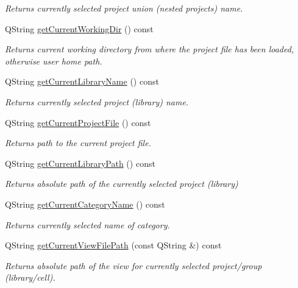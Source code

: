 \begin{DoxyCompactItemize}
\begin{DoxyCompactList}\small\item\em Returns currently selected project union (nested projects) name. \end{DoxyCompactList}\item 
Q\-String \hyperlink{classMainWindow_a122007410ead45d63e205e4aa612ac77}{get\-Current\-Working\-Dir} () const 
\begin{DoxyCompactList}\small\item\em Returns current working directory from where the project file has been loaded, otherwise user home path. \end{DoxyCompactList}\item 
Q\-String \hyperlink{classMainWindow_afae5dfaa6de8707fde2c2cc530a462b4}{get\-Current\-Library\-Name} () const 
\begin{DoxyCompactList}\small\item\em Returns currently selected project (library) name. \end{DoxyCompactList}\item 
Q\-String \hyperlink{classMainWindow_a0cb5632672f6e9f8091fcbb6ed7d8614}{get\-Current\-Project\-File} () const 
\begin{DoxyCompactList}\small\item\em Returns path to the current project file. \end{DoxyCompactList}\item 
Q\-String \hyperlink{classMainWindow_a2db5fde30507e1eb136ef3eeb17307dc}{get\-Current\-Library\-Path} () const 
\begin{DoxyCompactList}\small\item\em Returns absolute path of the currently selected project (library) \end{DoxyCompactList}\item 
Q\-String \hyperlink{classMainWindow_adf5753c529cbbe719f41d2fb456e7cea}{get\-Current\-Category\-Name} () const 
\begin{DoxyCompactList}\small\item\em Returns currently selected name of category. \end{DoxyCompactList}\item 
Q\-String \hyperlink{classMainWindow_a603c56475b8ef3f6eb34ad8396abfbea}{get\-Current\-View\-File\-Path} (const Q\-String \&) const 
\begin{DoxyCompactList}\small\item\em Returns absolute path of the view for currently selected project/group (library/cell). \end{DoxyCompactList}\item 

\end{DoxyCompactItemize}
